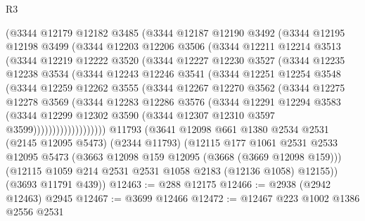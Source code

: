 \begin{lexlean}{R3}
\begin{coremodule}
        (@3344
          @12179
          @12182
          @3485
          (@3344
            @12187
            @12190
            @3492
            (@3344
              @12195
              @12198
              @3499
              (@3344
                @12203
                @12206
                @3506
                (@3344
                  @12211
                  @12214
                  @3513
                  (@3344
                    @12219
                    @12222
                    @3520
                    (@3344
                      @12227
                      @12230
                      @3527
                      (@3344
                        @12235
                        @12238
                        @3534
                        (@3344
                          @12243
                          @12246
                          @3541
                          (@3344
                            @12251
                            @12254
                            @3548
                            (@3344
                              @12259
                              @12262
                              @3555
                              (@3344
                                @12267
                                @12270
                                @3562
                                (@3344
                                  @12275
                                  @12278
                                  @3569
                                  (@3344
                                    @12283
                                    @12286
                                    @3576
                                    (@3344
                                      @12291
                                      @12294
                                      @3583
                                      (@3344
                                        @12299
                                        @12302
                                        @3590
                                        (@3344 @12307 @12310 @3597 @3599)))))))))))))))))))
    @11793
    (@3641
      @12098
      @661
      @1380
      @2534
      @2531
      (@2145 @12095 @5473)
      (@2344 @11793)
      (@12115
        @177
        @1061
        @2531
        @2533
        @12095
        @5473
        (@3663 @12098 @159 @12095 (@3668 (@3669 @12098 @159)))
        (@12115 @1059 @214 @2531 @2531 @1058 @2183 (@12136 @1058) @12155))
      (@3693 @11791 @439))
@12463 := @288 @12175
@12466 := @2938 (@2942 @12463) @2945
@12467 := @3699 @12466
@12472 := @12467 @223 @1002 @1386 @2556 @2531

\end{coremodule}
\end{lexlean}
